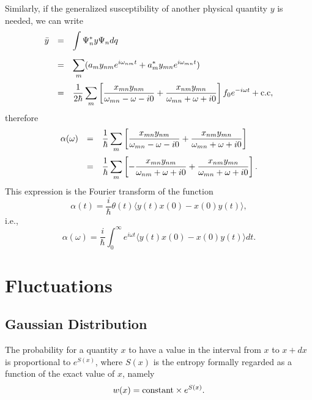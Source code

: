 \documentclass{book}
\newcommand{\average}[1]{\langle#1\rangle}
\numberwithin{equation}{section}
\begin{document}
Similarly, if the generalized susceptibility of another physical
quantity $y$ is needed, we can write
\begin{equation}
  \begin{array}{rcl}
    \bar{y}&=&\displaystyle\int \Psi_n^*y\Psi_ndq\\\vbox to 20pt{}
    &=&\displaystyle \sum_m(a_my_{nm}e^{i\omega_{nm}t}+
    a^*_{m}y_{mn}e^{i\omega_{mn}t})\\\vbox to 20pt{}
    &=&\displaystyle\frac{1}{2\hbar}\sum_m\left[
      \frac{x_{mn}y_{nm}}{\omega_{mn}-\omega-i0}+
      \frac{x_{nm}y_{mn}}{\omega_{mn}+\omega+i0}
      \right]f_0e^{-i\omega t}+\hbox{c.c},
  \end{array}
\end{equation}
therefore
\begin{equation}
  \begin{array}{rcl}
    \alpha(\omega)&=&\displaystyle\frac{1}{\hbar}\sum_m\left[
      \frac{x_{mn}y_{nm}}{\omega_{mn}-\omega-i0}+
      \frac{x_{nm}y_{mn}}{\omega_{mn}+\omega+i0}
      \right]\\\vbox to 20pt{}
    &=&\displaystyle\frac{1}{\hbar}\sum_m\left[
      -\frac{x_{mn}y_{nm}}{\omega_{nm}+\omega+i0}+
      \frac{x_{nm}y_{mn}}{\omega_{mn}+\omega+i0}
      \right].
  \end{array}
\end{equation}
This expression is the Fourier transform of the function
\begin{equation}
  \alpha(t)=\frac{i}{\hbar}\theta(t)\average{y(t)x(0)-x(0)y(t)},
\end{equation}
i.e.,
\begin{equation}
  \alpha(\omega)=\frac{i}{\hbar}\int_0^\infty e^{i\omega
    t}\average{y(t)x(0)-x(0)y(t)}dt.
\end{equation}



\chapter{Fluctuations}
\section{Gaussian Distribution}
The probability for a quantity $x$ to have a value in the interval
from $x$ to $x+dx$ is proportional to $e^{S(x)}$, where $S(x)$ is the
entropy formally regarded as a function of the exact value of $x$, namely
\begin{equation}
  w(x)={\rm constant}\times e^{S(x)}.
\end{equation}
\end{document}
